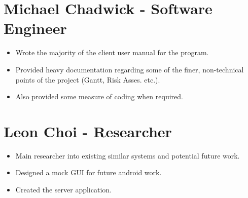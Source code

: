\section{Michael Chadwick - Software Engineer}
\begin{itemize}
\item Wrote the majority of the client user manual for the program.
\item Provided heavy documentation regarding some of the finer, non-technical
points of the project (Gantt, Risk Asses. etc.).
\item Also provided some measure of coding when required.
\end{itemize}

\section{Leon Choi - Researcher}
\begin{itemize}
\item Main researcher into existing similar systems and potential future work.
\item Designed a mock GUI for future android work.
\item Created the server application.
\end{itemize}

